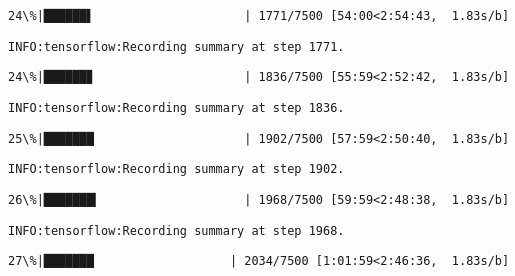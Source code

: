 \documentclass[11pt]{article}
\begin{document}
    \begin{Verbatim}[commandchars=\\\{\}]
 24\%|██████▌                     | 1771/7500 [54:00<2:54:43,  1.83s/b]
    \end{Verbatim}

    \begin{Verbatim}[commandchars=\\\{\}]
INFO:tensorflow:Recording summary at step 1771.

    \end{Verbatim}

    \begin{Verbatim}[commandchars=\\\{\}]
 24\%|██████▊                     | 1836/7500 [55:59<2:52:42,  1.83s/b]
    \end{Verbatim}

    \begin{Verbatim}[commandchars=\\\{\}]
INFO:tensorflow:Recording summary at step 1836.

    \end{Verbatim}

    \begin{Verbatim}[commandchars=\\\{\}]
 25\%|███████                     | 1902/7500 [57:59<2:50:40,  1.83s/b]
    \end{Verbatim}

    \begin{Verbatim}[commandchars=\\\{\}]
INFO:tensorflow:Recording summary at step 1902.

    \end{Verbatim}

    \begin{Verbatim}[commandchars=\\\{\}]
 26\%|███████▎                    | 1968/7500 [59:59<2:48:38,  1.83s/b]
    \end{Verbatim}

    \begin{Verbatim}[commandchars=\\\{\}]
INFO:tensorflow:Recording summary at step 1968.

    \end{Verbatim}

    \begin{Verbatim}[commandchars=\\\{\}]
 27\%|███████                   | 2034/7500 [1:01:59<2:46:36,  1.83s/b]
    \end{Verbatim}
\end{document}
